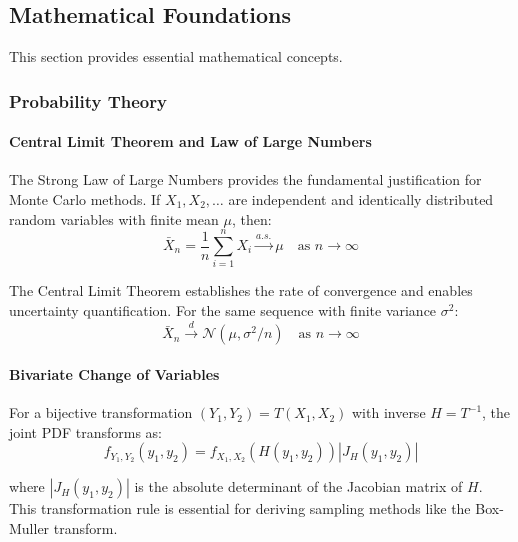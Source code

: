 \subsection{Mathematical Foundations}
\label{appendix:probability-theory}

This section provides essential mathematical concepts.

\subsubsection{Probability Theory}

\paragraph{Central Limit Theorem and Law of Large Numbers}
\label{appendix:clt}

The Strong Law of Large Numbers provides the fundamental justification for Monte Carlo methods. If $X_1, X_2, \ldots$ are independent and identically distributed random variables with finite mean $\mu$, then:
\begin{equation*}
    \bar{X}_n = \frac{1}{n}\sum_{i=1}^n X_i \xrightarrow{a.s.} \mu \quad \text{as } n \to \infty
\end{equation*}

The Central Limit Theorem establishes the rate of convergence and enables uncertainty quantification. For the same sequence with finite variance $\sigma^2$:
\begin{equation*}
    \bar{X}_n \xrightarrow{d} \mathcal{N}(\mu, \sigma^2/n) \quad \text{as } n \to \infty
\end{equation*}


\paragraph{Bivariate Change of Variables}
\label{appendix:change_of_vars}

For a bijective transformation $(Y_1,Y_2) = T(X_1,X_2)$ with inverse $H = T^{-1}$, the joint PDF transforms as:
\begin{equation*}
    f_{Y_1,Y_2}(y_1,y_2) = f_{X_1,X_2}(H(y_1,y_2)) \left|J_H(y_1,y_2)\right|
\end{equation*}

where $\left|J_H(y_1,y_2)\right|$ is the absolute determinant of the Jacobian matrix of $H$. This transformation rule is essential for deriving sampling methods like the Box-Muller transform.


